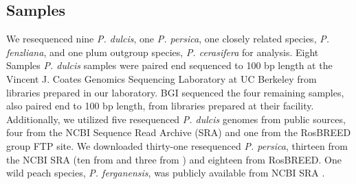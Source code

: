 \documentclass[12pt]{article}
\begin{document}
\subsection*{Samples}
We resequenced nine \emph{P. dulcis}, one \emph{P. persica}, one closely related species, \emph{P. fenzliana}, and one plum outgroup species, \emph{P. cerasifera} for analysis.
%
Eight Samples \emph{P. dulcis} samples were paired end sequenced to 100 bp length at the Vincent J. Coates Genomics Sequencing Laboratory at UC Berkeley from libraries prepared in our laboratory. 
%
%
BGI sequenced the four remaining samples, also paired end to 100 bp length, from libraries prepared at their facility.
%
Additionally, we utilized five resequenced \emph{P. dulcis} genomes from public sources,  four from \citealt{koepke2013comparative} 
the NCBI Sequence Read Archive (SRA) and one from the RosBREED group FTP site.
%
We downloaded thirty-one resequenced \emph{P. persica}, thirteen from the NCBI SRA (ten from \citealt{verde2013high} and three from \citealt{ahmad2011whole}) and eighteen from RosBREED.
%
One wild peach species, \emph{P. ferganensis}, was publicly available from NCBI SRA \citep{verde2013high}.\\
%
%
\end{document}

